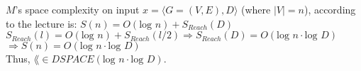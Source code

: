 $M$'s space complexity on input $x=\langle G = (V,E), D \rangle$ (where $|V|=n$), according to the lecture is:
$S(n) = O(\text{log }n) + S_{Reach}(D)$ \\
$S_{Reach}(l) = O(\text{log }n) + S_{Reach}(l/2) \Rightarrow S_{Reach}(D) = O(\text{log }n \cdot \text{log }D)$ \\
$\Longrightarrow S(n) = O(\text{log }n \cdot \text{log }D)$ \\
Thus, $\lang \in DSPACE(\text{log }n \cdot \text{log }D)$.
